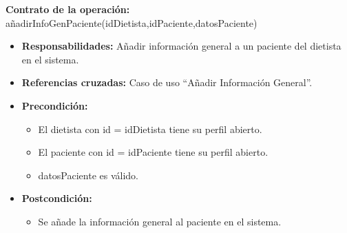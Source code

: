\textbf{Contrato de la operación:} añadirInfoGenPaciente(idDietista,idPaciente,datosPaciente)
\begin{itemize}
\item \textbf{Responsabilidades:} Añadir información general a un paciente del dietista en el sistema.
\item \textbf{Referencias cruzadas:} Caso de uso ``Añadir Información General''.
\item \textbf{Precondición:}
\begin{itemize}
\item El dietista con id = idDietista tiene su perfil abierto.
\item El paciente con id = idPaciente tiene su perfil abierto.
\item datosPaciente es válido.
\end{itemize}
\item \textbf{Postcondición:}
\begin{itemize}
\item Se añade la información general al paciente en el sistema.
\end{itemize}
\end{itemize}

